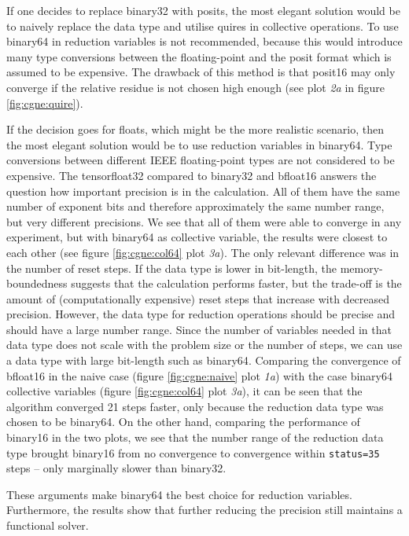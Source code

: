 \documentclass{article}
\theoremstyle{plain} %
\theoremstyle{convention} %
\theoremstyle{remark} %
\def\code#1{\texttt{#1}}
\numberwithin{equation}{section}
\begin{document}
If one decides to replace \gls{binary32} with posits, the most elegant solution would be to naively replace the data type and utilise \glspl{quire} in collective operations. To use \gls{binary64} in reduction variables is not recommended, because this would introduce many type conversions between the floating-point and the posit format which is assumed to be expensive. The drawback of this method is that \gls{posit16} may only converge if the relative residue is not chosen high enough (see plot \textit{2a} in figure \ref{fig:cgne:quire}).

If the decision goes for floats, which might be the more realistic scenario, then the most elegant solution would be to use reduction variables in \gls{binary64}. Type conversions between different IEEE floating-point types are not considered to be expensive. The \gls{tensorfloat32} compared to \gls{binary32} and \gls{bfloat16} answers the question how important precision is in the calculation. All of them have the same number of exponent bits and therefore approximately the same number range, but very different precisions. We see that all of them were able to converge in any experiment, but with \gls{binary64} as collective variable, the results were closest to each other (see figure \ref{fig:cgne:col64} plot \textit{3a}). The only relevant difference was in the number of reset steps. If the data type is lower in bit-length, the memory-boundedness suggests that the calculation performs faster, but the trade-off is the amount of (computationally expensive) reset steps that increase with decreased precision. However, the data type for reduction operations should be precise and should have a large number range. Since the number of variables needed in that data type does not scale with the problem size or the number of steps, we can use a data type with large bit-length such as \gls{binary64}. Comparing the convergence of \gls{bfloat16} in the naive case (figure \ref{fig:cgne:naive} plot \textit{1a}) with the case \gls{binary64} collective variables (figure \ref{fig:cgne:col64} plot \textit{3a}), it can be seen that the algorithm converged \num{21} steps faster, only because the reduction data type was chosen to be \gls{binary64}. On the other hand, comparing the performance of \gls{binary16} in the two plots, we see that the number range of the reduction data type brought \gls{binary16} from no convergence to convergence within \code{status=35} steps -- only marginally slower than \gls{binary32}.

These arguments make \gls{binary64} the best choice for reduction variables. Furthermore, the results show that further reducing the precision still maintains a functional solver.
\end{document}
